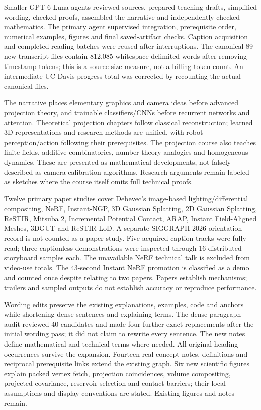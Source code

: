 Smaller GPT-6 Luna agents reviewed sources, prepared teaching drafts, simplified wording, checked proofs, assembled the narrative and independently checked mathematics. The primary agent supervised integration, prerequisite order, numerical examples, figures and final saved-artifact checks. Caption acquisition and completed reading batches were reused after interruptions. The canonical 89 new transcript files contain 812,085 whitespace-delimited words after removing timestamp tokens; this is a source-size measure, not a billing-token count. An intermediate UC Davis progress total was corrected by recounting the actual canonical files.

The narrative places elementary graphics and camera ideas before advanced projection theory, and trainable classifiers/CNNs before recurrent networks and attention. Theoretical projection chapters follow classical reconstruction; learned 3D representations and research methods are unified, with robot perception/action following their prerequisites. The projection course also teaches finite fields, additive combinatorics, number-theory analogies and homogeneous dynamics. These are presented as mathematical developments, not falsely described as camera-calibration algorithms. Research arguments remain labeled as sketches where the course itself omits full technical proofs.

Twelve primary paper studies cover Debevec's image-based lighting/differential compositing, NeRF, Instant-NGP, 3D Gaussian Splatting, 2D Gaussian Splatting, ReSTIR, Mitsuba 2, Incremental Potential Contact, ARAP, Instant Field-Aligned Meshes, 3DGUT and ReSTIR LoD. A separate SIGGRAPH 2026 orientation record is not counted as a paper study. Five acquired caption tracks were fully read; three captionless demonstrations were inspected through 16 distributed storyboard samples each. The unavailable NeRF technical talk is excluded from video-use totals. The 43-second Instant NeRF promotion is classified as a demo and counted once despite relating to two papers. Papers establish mechanisms; trailers and sampled outputs do not establish accuracy or reproduce performance.

Wording edits preserve the existing explanations, examples, code and anchors while shortening dense sentences and explaining terms. The dense-paragraph audit reviewed 40 candidates and made four further exact replacements after the initial wording pass; it did not claim to rewrite every sentence. The new notes define mathematical and technical terms where needed. All original heading occurrences survive the expansion. Fourteen real concept notes, definitions and reciprocal prerequisite links extend the existing graph. Six new scientific figures explain packed vertex fetch, projection coincidences, volume compositing, projected covariance, reservoir selection and contact barriers; their local assumptions and display conventions are stated. Existing figures and notes remain.

